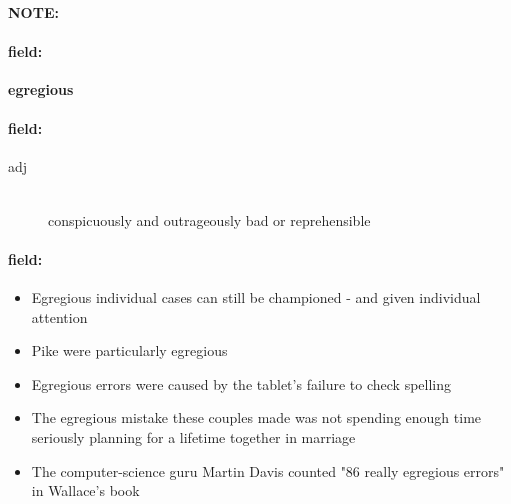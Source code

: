 \documentclass[12pt]{article}
\newenvironment{note}{\paragraph{NOTE:}}{}
\newenvironment{field}{\paragraph{field:}}{}
\begin{document}
\begin{note}
\begin{field}
\textbf{\large egregious}
\end{field}


\begin{field}
\begin{description}
\item[adj] \hfill \\ 
conspicuously and outrageously bad or reprehensible

\end{description}
\end{field}

\begin{field}
\begin{itemize}
\item Egregious individual cases can still be championed - and given individual attention
\item  Pike were particularly egregious
\item Egregious errors were caused by the tablet's failure to check spelling
\item The egregious mistake these couples made was not spending enough time seriously planning for a lifetime together in marriage
\item The computer-science guru Martin Davis counted "86 really egregious errors" in Wallace's book
\end{itemize}
\end{field}
\end{note}
\end{document}

